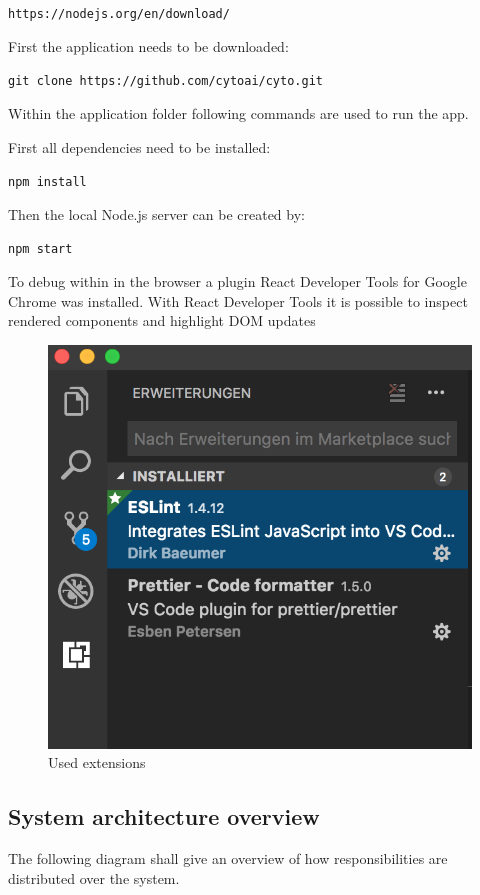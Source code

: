 \texttt{https://nodejs.org/en/download/}

First the application needs to be downloaded:

\texttt{git clone https://github.com/cytoai/cyto.git}

Within the application folder following commands are used to
run the app.

First all dependencies need to be installed:

\texttt{npm install}

Then the local Node.js server can be created by:

\texttt{npm start}

To debug within in the browser a plugin React Developer Tools
for Google Chrome was installed. With React Developer Tools
it is possible to inspect rendered components and highlight DOM updates 

\begin{figure}[H]
	\centering
	\includegraphics[scale=0.5]{bilder/cyto/LINT.png}
	\caption{Used extensions}
	\label{fig:Extensions}
\end{figure}





\subsection{System architecture overview}
The following diagram shall give an overview of how responsibilities are distributed over the system.

